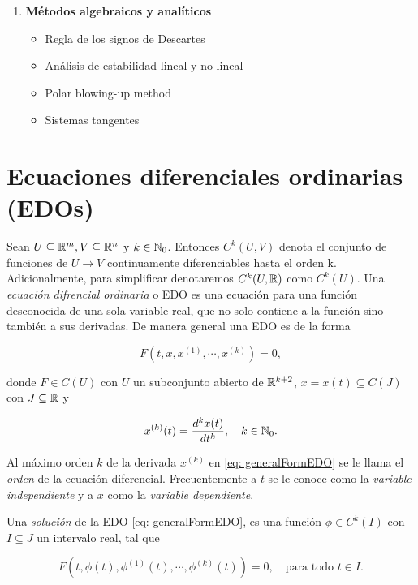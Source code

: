 \begin{enumerate}
	\item \textbf{Métodos algebraicos y analíticos}
	\begin{itemize}
		\item Regla de los signos de Descartes
		\item Análisis de estabilidad lineal y no lineal
		\item Polar blowing-up method
		\item Sistemas tangentes
	\end{itemize}
\end{enumerate}

\section{Ecuaciones diferenciales ordinarias (EDOs)}

Sean $U \subseteq {\mathbb{R}}^{m}, V \subseteq {\mathbb{R}}^{n}$ y $k\in {\mathbb{N}}_{0}$. Entonces $C^{k}(U, V)$ denota el conjunto de funciones de $U \longrightarrow V$ continuamente diferenciables hasta el orden k. Adicionalmente, para simplificar denotaremos $C^{k}(U, {\mathbb{R}})$ como $C^{k}(U)$. Una \textit{ecuación difrencial ordinaria} o EDO es una ecuación para una función desconocida de una sola variable real, que no solo contiene a la función sino también a sus derivadas. De manera general una EDO es de la forma

\begin{equation}
	F(t, x, x^{(1)}, \cdots, x^{(k)}) = 0,
	\label{eq: generalFormEDO}
\end{equation}

donde $F \in C(U)$ con $U$ un subconjunto abierto de ${\mathbb{R}}^{k+2}$, $x = x(t) \subseteq C(J)$ con $J \subseteq {\mathbb{R}}$ y

\begin{equation*}
	x^{(k)}(t) = \frac{d^{k}x(t)}{dt^{k}}, \quad k \in {\mathbb{N}}_{0}.
\end{equation*}

Al máximo orden $k$ de la derivada $x^{(k)}$ en \eqref{eq: generalFormEDO} se le llama el \textit{orden} de la ecuación diferencial. Frecuentemente a $t$ se le conoce como la \textit{variable independiente} y a $x$ como la \textit{variable dependiente}.

Una \textit{solución} de la EDO \eqref{eq: generalFormEDO}, es una función $\phi \in C^{k}(I)$ con $I \subseteq J$ un intervalo real, tal que

\begin{equation}
	F(t, \phi(t), \phi^{(1)}(t), \cdots, \phi^{(k)}(t)) = 0, \quad \text{para todo } t \in I.
\end{equation}

